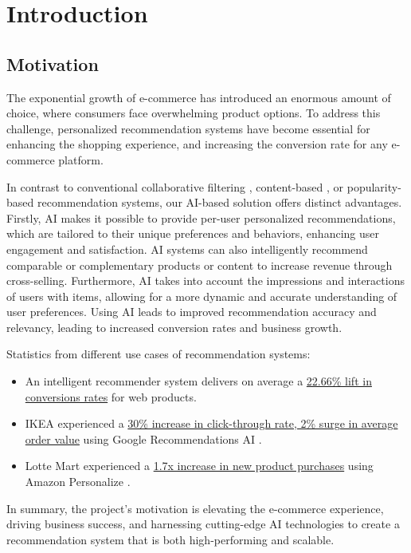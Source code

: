 \chapter{Introduction}
\minitoc

\section{Motivation}

The exponential growth of e-commerce has introduced an enormous amount of choice, where consumers face overwhelming product options. To address this challenge, personalized recommendation systems have become essential for enhancing the shopping experience, and increasing the conversion rate for any e-commerce platform.

In contrast to conventional collaborative filtering \cite{NvidiaRecSys}, content-based \cite{NvidiaRecSys}, or popularity-based recommendation systems, our AI-based solution offers distinct advantages. Firstly, AI makes it possible to provide per-user personalized recommendations, which are tailored to their unique preferences and behaviors, enhancing user engagement and satisfaction. AI systems can also intelligently recommend comparable or complementary products or content to increase revenue through cross-selling. Furthermore, AI takes into account the impressions and interactions of users with items, allowing for a more dynamic and accurate understanding of user preferences. Using AI leads to improved recommendation accuracy and relevancy, leading to increased conversion rates and business growth.
    




Statistics from different use cases of recommendation systems:
\begin{itemize}[left=0in]
    \item An intelligent recommender system delivers on average a
    \underline{22.66\% lift in conversions rates} \cite{salesforce2014predictive} for web products.
    
    \item IKEA experienced a \underline{30\% increase in click-through rate, 2\% surge in average order value} \cite{IkeaRecAtGoogleCloudSummit} using Google Recommendations AI \cite{GoogleRecommendationsAI}.
    
    \item Lotte Mart experienced a
    \underline{1.7x increase in new product purchases}  \cite{LotteMartAwsPersonalize} using Amazon Personalize \cite{AWSPersonalize}.
\end{itemize}
In summary, the project's motivation is elevating the e-commerce experience, driving business success, and harnessing cutting-edge AI technologies to create a recommendation system that is both high-performing and scalable.

